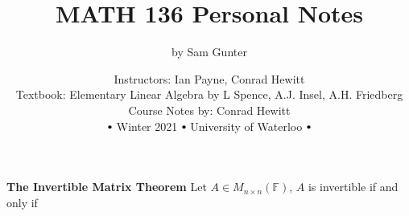 \documentclass[11pt,notitlepage]{report}
\makeatletter
\newcommand{\bb}[1]{\ensuremath{\mathbb{#1}}}
\newcommand\sbullet[1][.75]{\mathbin{\vcenter{\hbox{\scalebox{#1}{$\bullet$}}}}}
\newcommand*{\toccontents}{\@starttoc{toc}}
\makeatother
\begin{document}
\parindent=0pt

\title{\vspace{-15mm}MATH 136 Personal Notes \vspace{-5mm}}
\author{by Sam Gunter}
\date{Instructors: Ian Payne, Conrad Hewitt\\ 
Textbook: Elementary Linear Algebra by L Spence, A.J. Insel, A.H. Friedberg\\
Course Notes by: Conrad Hewitt\\
$\sbullet$ Winter 2021 $\sbullet$ University of Waterloo $\sbullet$\vspace{-1mm}}
\maketitle
\toccontents

\newpage
\setcounter{page}{1}
\textbf{The Invertible Matrix Theorem} Let $A \in M_{n \times n}(\bb F)$, $A$ is invertible if and only if
\end{document}
